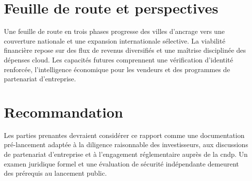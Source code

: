 \section*{Feuille de route et perspectives}

Une feuille de route en trois phases progresse des villes d'ancrage vers une couverture nationale et une expansion internationale sélective. La viabilité financière repose sur des flux de revenus diversifiés et une maîtrise disciplinée des dépenses cloud. Les capacités futures comprennent une vérification d'identité renforcée, l'intelligence économique pour les vendeurs et des programmes de partenariat d'entreprise.

\section*{Recommandation}

Les parties prenantes devraient considérer ce rapport comme une documentation pré-lancement adaptée à la diligence raisonnable des investisseurs, aux discussions de partenariat d'entreprise et à l'engagement réglementaire auprès de la \gls{cndp}. Un examen juridique formel et une évaluation de sécurité indépendante demeurent des prérequis au lancement public.
